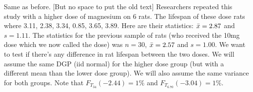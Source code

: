 \documentclass[12pt,landscape]{article}
\begin{document}

%
%
%
%
%
%
%
%

\problem{} Same as before. [But no space to put the old text] Researchers repeated this study with a higher dose of magnesium on 6 rats. The lifespan of these  dose rats where 3.11, 2.38, 3.34, 0.85, 3.65, 3.89. Here are their statistics: $\bar{x} = 2.87$ and $s = 1.11$. The statistics for the previous sample of rats (who received the 10mg dose which we now called the  dose) was $n=30$, $\bar{x} = 2.57$ and $s = 1.00$. We want to test if there's any difference in rat lifespan between the two doses. We will assume the same DGP (iid normal) for the higher dose group (but with a different mean than the lower dose group). We will also assume the same variance for both groups. Note that $F_{T_{34}}(-2.44) = 1\%$ and $F_{T_{6.70}}(-3.04) = 1\%$.
\vspace{-0.2cm}\benum{} 
\end{document}
